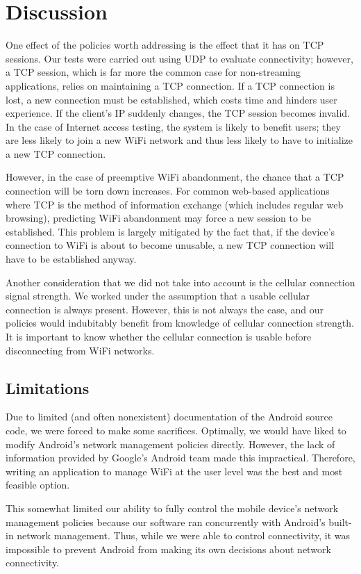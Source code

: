 \section{Discussion}
\label{sec:disc}

One effect of the policies worth addressing is the effect that it has on TCP sessions. Our tests were carried out using UDP to evaluate connectivity; however, a TCP session, which is far more the common case for non-streaming applications, relies on maintaining a TCP connection. If a TCP connection is lost, a new connection must be established, which costs time and hinders user experience. If the client's IP suddenly changes, the TCP session becomes invalid. In the case of Internet access testing, the system is likely to benefit users; they are less likely to join a new WiFi network and thus less likely to have to initialize a new TCP connection.

However, in the case of preemptive WiFi abandonment, the chance that a TCP connection will be torn down increases. For common web-based applications where TCP is the method of information exchange (which includes regular web browsing), predicting WiFi abandonment may force a new session to be established. This problem is largely mitigated by the fact that, if the device's connection to WiFi is about to become unusable, a new TCP connection will have to be established anyway.

Another consideration that we did not take into account is the cellular connection signal strength. We worked under the assumption that a usable cellular connection is always present. However, this is not always the case, and our policies would indubitably benefit from knowledge of cellular connection strength. It is important to know whether the cellular connection is usable before disconnecting from WiFi networks.

\subsection{Limitations}

Due to limited (and often nonexistent) documentation of the Android source code, we were forced to make some sacrifices. Optimally, we would have liked to modify Android's network management policies directly. However, the lack of information provided by Google's Android team made this impractical. Therefore, writing an application to manage WiFi at the user level was the best and most feasible option.

This somewhat limited our ability to fully control the mobile device's network management policies because our software ran concurrently with Android's built-in network management. Thus, while we were able to control connectivity, it was impossible to prevent Android from making its own decisions about network connectivity.

